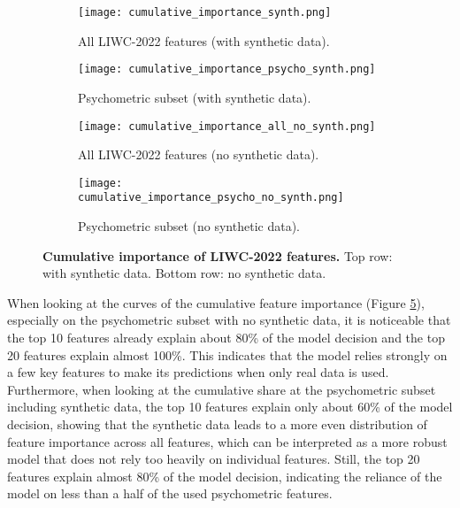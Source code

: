 \begin{figure}[H]
  \centering
  
  \begin{subfigure}[t]{0.49\textwidth}
    \centering
    \texttt{[image: cumulative\_importance\_synth.png]}
    \caption{All LIWC-2022 features (with synthetic data).}
    \label{fig:cum_synth_all}
  \end{subfigure}\hfill
  \begin{subfigure}[t]{0.49\textwidth}
    \centering
    \texttt{[image: cumulative\_importance\_psycho\_synth.png]}
    \caption{Psychometric subset (with synthetic data).}
    \label{fig:cum_synth_psycho}
  \end{subfigure}
  
  \vspace{0.5cm}
  
  \begin{subfigure}[t]{0.49\textwidth}
    \centering
    \texttt{[image: cumulative\_importance\_all\_no\_synth.png]}
    \caption{All LIWC-2022 features (no synthetic data).}
    \label{fig:cum_no_synth_all}
  \end{subfigure}\hfill
  \begin{subfigure}[t]{0.49\textwidth}
    \centering
    \texttt{[image: cumulative\_importance\_psycho\_no\_synth.png]}
    \caption{Psychometric subset (no synthetic data).}
    \label{fig:cum_no_synth_psycho}
  \end{subfigure}

  \caption[Cumulative importance of LIWC-2022 features.]{\textbf{Cumulative importance of LIWC-2022 features.} 
  Top row: with synthetic data. Bottom row: no synthetic data.}
  \label{fig:cumulative_feature_importance_combined}
\end{figure}

When looking at the curves of the cumulative feature importance (Figure \ref{fig:cumulative_feature_importance_combined}), especially on the psychometric subset with no synthetic data, it is noticeable that the top 10 features already explain about 80\% of the model decision and the top 20 features explain almost 100\%. This indicates that the model relies strongly on a few key features to make its predictions when only real data is used. Furthermore, when looking at the cumulative share at the psychometric subset including synthetic data, the top 10 features explain only about 60\% of the model decision, showing that the synthetic data leads to a more even distribution of feature importance across all features, which can be interpreted as a more robust model that does not rely too heavily on individual features. Still, the top 20 features explain almost 80\% of the model decision, indicating the reliance of the model on less than a half of the used psychometric features.

